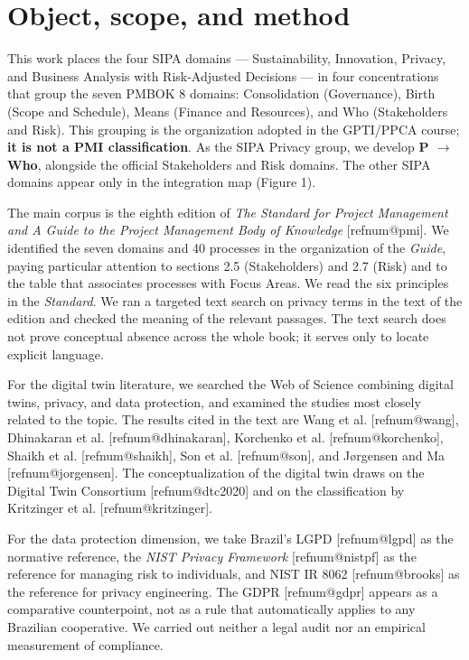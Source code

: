 \documentclass[11pt,a4paper]{article}
\makeatletter
\newcommand{\refnum}[1]{\csname refnum@#1\endcsname}
\makeatother
\begin{document}
\section{Object, scope, and method}

This work places the four SIPA domains — Sustainability, Innovation, Privacy, and Business Analysis with Risk-Adjusted Decisions — in four concentrations that group the seven PMBOK 8 domains: Consolidation (Governance), Birth (Scope and Schedule), Means (Finance and Resources), and Who (Stakeholders and Risk). This grouping is the organization adopted in the GPTI/PPCA course; \textbf{it is not a PMI classification}. As the SIPA Privacy group, we develop \textbf{P \ensuremath{\rightarrow} Who}, alongside the official Stakeholders and Risk domains. The other SIPA domains appear only in the integration map (Figure 1).

The main corpus is the eighth edition of \textit{The Standard for Project Management and A Guide to the Project Management Body of Knowledge} [\refnum{pmi}]. We identified the seven domains and 40 processes in the organization of the \textit{Guide}, paying particular attention to sections 2.5 (Stakeholders) and 2.7 (Risk) and to the table that associates processes with Focus Areas. We read the six principles in the \textit{Standard}. We ran a targeted text search on privacy terms in the text of the edition and checked the meaning of the relevant passages. The text search does not prove conceptual absence across the whole book; it serves only to locate explicit language.

For the digital twin literature, we searched the Web of Science combining digital twins, privacy, and data protection, and examined the studies most closely related to the topic. The results cited in the text are Wang et al. [\refnum{wang}], Dhinakaran et al. [\refnum{dhinakaran}], Korchenko et al. [\refnum{korchenko}], Shaikh et al. [\refnum{shaikh}], Son et al. [\refnum{son}], and Jørgensen and Ma [\refnum{jorgensen}]. The conceptualization of the digital twin draws on the Digital Twin Consortium [\refnum{dtc2020}] and on the classification by Kritzinger et al. [\refnum{kritzinger}].

For the data protection dimension, we take Brazil's LGPD [\refnum{lgpd}] as the normative reference, the \textit{NIST Privacy Framework} [\refnum{nistpf}] as the reference for managing risk to individuals, and NIST IR 8062 [\refnum{brooks}] as the reference for privacy engineering. The GDPR [\refnum{gdpr}] appears as a comparative counterpoint, not as a rule that automatically applies to any Brazilian cooperative. We carried out neither a legal audit nor an empirical measurement of compliance.
\end{document}
